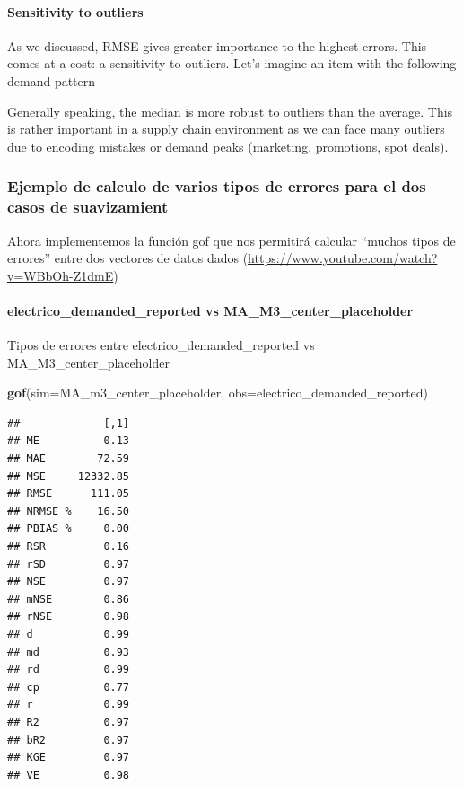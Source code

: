 \documentclass[
]{article}
\newenvironment{Shaded}{\begin{snugshade}}{\end{snugshade}}
\newcommand{\AttributeTok}[1]{\textcolor[rgb]{0.13,0.29,0.53}{#1}}
\newcommand{\FunctionTok}[1]{\textcolor[rgb]{0.13,0.29,0.53}{\textbf{#1}}}
\newcommand{\NormalTok}[1]{#1}
\begin{document}
\hypertarget{sensitivity-to-outliers}{%
\paragraph{Sensitivity to outliers}\label{sensitivity-to-outliers}}

As we discussed, RMSE gives greater importance to the highest errors.
This comes at a cost: a sensitivity to outliers. Let's imagine an item
with the following demand pattern

Generally speaking, the median is more robust to outliers than the
average. This is rather important in a supply chain environment as we
can face many outliers due to encoding mistakes or demand peaks
(marketing, promotions, spot deals).

\hypertarget{ejemplo-de-calculo-de-varios-tipos-de-errores-para-el-dos-casos-de-suavizamient}{%
\subsubsection{Ejemplo de calculo de varios tipos de errores para el dos
casos de
suavizamient}\label{ejemplo-de-calculo-de-varios-tipos-de-errores-para-el-dos-casos-de-suavizamient}}

Ahora implementemos la función gof que nos permitirá calcular ``muchos
tipos de errores'' entre dos vectores de datos dados
(\url{https://www.youtube.com/watch?v=WBbOh-Z1dmE})

\hypertarget{electrico_demanded_reported-vs-ma_m3_center_placeholder}{%
\paragraph{electrico\_demanded\_reported vs
MA\_M3\_center\_placeholder}\label{electrico_demanded_reported-vs-ma_m3_center_placeholder}}

Tipos de errores entre electrico\_demanded\_reported vs
MA\_M3\_center\_placeholder

\begin{Shaded}
\begin{Highlighting}[]
\FunctionTok{gof}\NormalTok{(}\AttributeTok{sim=}\NormalTok{MA\_m3\_center\_placeholder, }\AttributeTok{obs=}\NormalTok{electrico\_demanded\_reported)}
\end{Highlighting}
\end{Shaded}

\begin{verbatim}
##             [,1]
## ME          0.13
## MAE        72.59
## MSE     12332.85
## RMSE      111.05
## NRMSE %    16.50
## PBIAS %     0.00
## RSR         0.16
## rSD         0.97
## NSE         0.97
## mNSE        0.86
## rNSE        0.98
## d           0.99
## md          0.93
## rd          0.99
## cp          0.77
## r           0.99
## R2          0.97
## bR2         0.97
## KGE         0.97
## VE          0.98
\end{verbatim}
\end{document}
